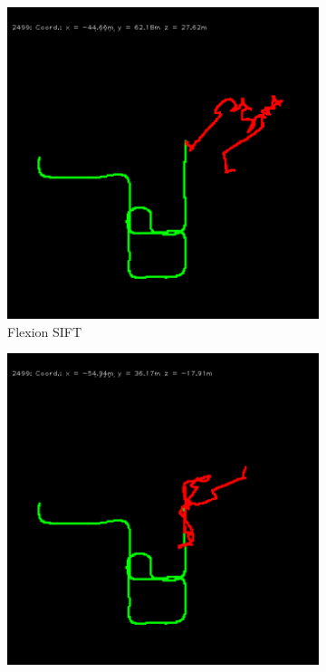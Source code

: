 \begin{figure}[H]
\begin{subfigure}[c]{0.31\linewidth}
    \includegraphics[width=\linewidth]{chapter06/odo/jonas_flexion_SIFT.png}%
    \caption{Flexion SIFT}
\end{subfigure}%
\begin{subfigure}[c]{0.31\linewidth}
    \includegraphics[width=\linewidth]{chapter06/odo/jonas_bearing_SIFT.png}%

\end{subfigure}
\end{figure}
